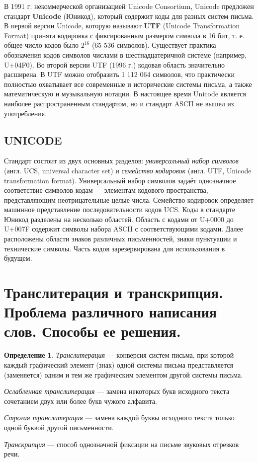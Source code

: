 \documentclass[12pt]{article}
\theoremstyle{definition}
\newtheorem*{defn}{Определение}
\theoremstyle{remark}
\numberwithin{equation}{section}
\begin{document}
В 1991 г. некоммерческой организацией Unicode Consortium, Unicode предложен стандарт \textbf{Unicode} (Юникод), который содержит коды для разных систем письма.
В первой версии Unicode, которую называют \textbf{UTF} (Unicode Transformation Format) принята кодировка с фиксированным размером символа в 16 бит, т. е. общее число кодов было $2^{16}$ (65 536 символов). Существует практика обозначения кодов символов числами в шестнадцатеричной системе (например, U+04F0).
Во второй версии UTF (1996 г.) кодовая область значительно расширена. В UTF можно отобразить 1 112 064 символов, что практически полностью охватывает все современные и исторические системы письма, а также математическую и музыкальную нотации. В настоящее время Unicode является наиболее распространенным стандартом, но и стандарт ASCII не вышел из употребления.

\subsection{UNICODE}
Стандарт состоит из двух основных разделов: \textit{универсальный набор символов} (англ. UCS, universal character set) и \textit{семейство кодировок} (англ. UTF, Unicode transformation format). Универсальный набор символов задаёт однозначное соответствие символов кодам --- элементам кодового пространства, представляющим неотрицательные целые числа. Семейство кодировок определяет машинное представление последовательности кодов UCS.
Коды в стандарте Юникод разделены на несколько областей. Область с кодами от U+0000 до U+007F содержит символы набора ASCII с соответствующими кодами. Далее расположены области знаков различных письменностей, знаки пунктуации и технические символы. Часть кодов зарезервирована для использования в будущем.

\section{Транслитерация и транскрипция. Проблема различного написания слов. Способы ее решения.}
\begin{defn}
\textit{Транслитерация} --– конверсия систем письма, при которой каждый графический элемент (знак) одной системы письма представляется (заменяется) одним и тем же графическим элементом другой системы письма.

\textit{Ослабленная транслитерация} --– замена некоторых букв исходного текста сочетанием двух или более букв чужого алфавита.

\textit{Строгая транслитерация} --– замена каждой буквы исходного текста только одной буквой другой письменности.

\textit{Транскрипция} --– способ однозначной фиксации на письме звуковых отрезков речи.
\end{defn}
\end{document}
